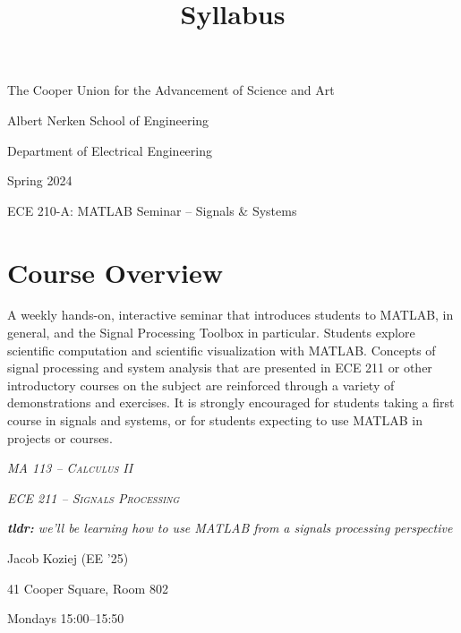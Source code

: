 \documentclass{article}
\title{Syllabus}
\begin{document}
\renderTitle

\scshape
\slshape

\begin{Centering}
\noindent
The Cooper Union for the Advancement of Science and Art

\noindent
Albert Nerken School of Engineering

\noindent
Department of Electrical Engineering

\noindent
Spring 2024

\leavevmode
\newline

\noindent
ECE 210-A: MATLAB Seminar -- Signals \& Systems

\end{Centering}

\normalfont

\section{Course Overview}


\begin{displayquote}
	A weekly hands-on, interactive seminar that introduces students
	to MATLAB, in general, and the Signal Processing Toolbox in
	particular.  Students explore scientific computation and
	scientific visualization with MATLAB.  Concepts of signal
	processing and system analysis that are presented in ECE 211 or
	other introductory courses on the subject are reinforced through
	a variety of demonstrations and exercises.  It is strongly
	encouraged for students taking a first course in signals and
	systems, or for students expecting to use MATLAB in projects or
	courses.

	\footnotesize

	\noindent
	 \textsc{\textsl{MA 113 -- Calculus II}}

	\noindent
	 \textsc{\textsl{ECE 211 -- Signals
	Processing}}

	\noindent
	\textsl{\textbf{tldr:} we'll be learning how to use MATLAB from
	a signals processing perspective}
\end{displayquote}

\noindent
{} Jacob Koziej (EE '25)

\noindent
{} 41 Cooper Square, Room 802

\noindent
{} Mondays 15:00--15:50
\end{document}
